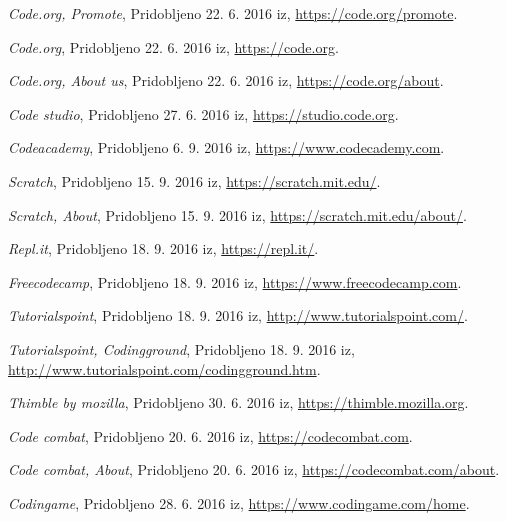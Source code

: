 \begin{thebibliography}{100}
 \emph{Code.org, Promote}, Pridobljeno
  22. 6. 2016 iz, \url{https://code.org/promote}.

 \emph{Code.org}, Pridobljeno
  22. 6. 2016 iz, \url{https://code.org}.

 \emph{Code.org, About us}, Pridobljeno
  22. 6. 2016 iz, \url{https://code.org/about}.

 \emph{Code studio}, Pridobljeno
  27. 6. 2016 iz, \url{https://studio.code.org}.

 \emph{Codeacademy}, Pridobljeno 6. 9. 2016 iz,
  \url{https://www.codecademy.com}.

 \emph{Scratch}, Pridobljeno 15. 9. 2016 iz,
  \url{https://scratch.mit.edu/}.

 \emph{Scratch, About}, Pridobljeno 15. 9. 2016 iz,
  \url{https://scratch.mit.edu/about/}.

 \emph{Repl.it}, Pridobljeno 18. 9. 2016 iz,
  \url{https://repl.it/}.

 \emph{Freecodecamp}, Pridobljeno 18. 9. 2016 iz,
  \url{https://www.freecodecamp.com}.

 \emph{Tutorialspoint}, Pridobljeno 18. 9. 2016 iz,
  \url{http://www.tutorialspoint.com/}.

 \emph{Tutorialspoint,
    Codingground}, Pridobljeno 18. 9. 2016 iz,
  \url{http://www.tutorialspoint.com/codingground.htm}.

 \emph{Thimble by mozilla}, Pridobljeno
  30. 6. 2016 iz, \url{https://thimble.mozilla.org}.

 \emph{Code combat}, Pridobljeno 20. 6. 2016 iz,
  \url{https://codecombat.com}.

 \emph{Code combat, About}, Pridobljeno
  20. 6. 2016 iz, \url{https://codecombat.com/about}.

 \emph{Codingame}, Pridobljeno 28. 6. 2016 iz,
  \url{https://www.codingame.com/home}.

\end{thebibliography}



